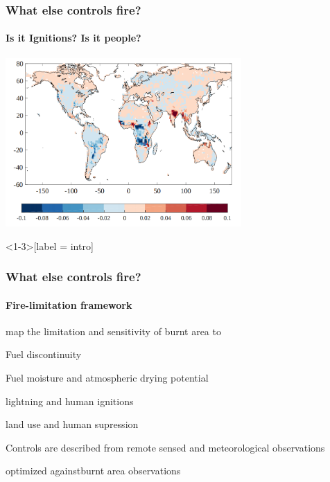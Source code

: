 
\begin{frame}
    \frametitle{What else controls fire?}
    \framesubtitle{Is it Ignitions? Is it people?}
    \includegraphics[width=9.0cm]{images/INFERNO}%
\end{frame}




\begin{frame}<1-3>[label = intro]
    \frametitle{What else controls fire?}
    \framesubtitle{Fire-limitation framework}
	\begin{itemize}
		 {\item map the limitation and sensitivity of burnt area to}
        \begin{itemize}
             {\item Fuel discontinuity}
             {\item Fuel moisture and atmospheric drying potential}
             {\item lightning and human ignitions}
             {\item land use and human supression}
        \end{itemize}
		 {\item Controls are described from remote sensed and meteorological observations}
		 {\item optimized againstburnt area observations}
	\end{itemize}
\end{frame}
